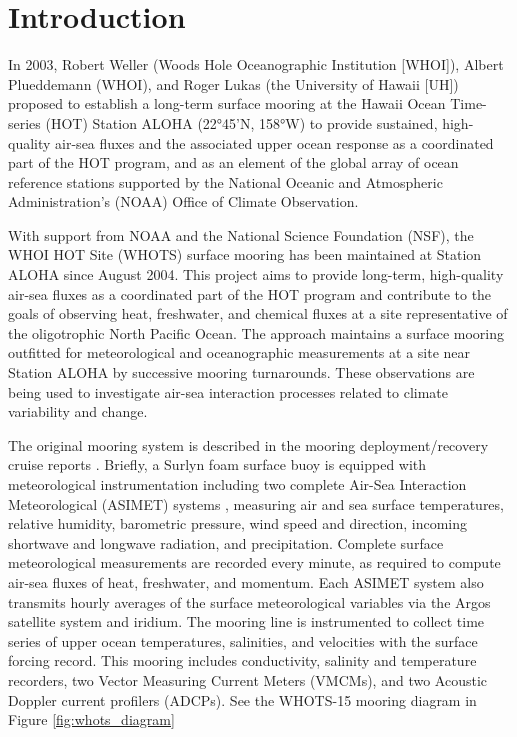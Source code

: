 \section{Introduction}

In 2003, Robert Weller (Woods Hole Oceanographic Institution [WHOI]), Albert Plueddemann (WHOI), and Roger Lukas (the University of Hawaii [UH]) proposed to establish a long-term surface mooring at the Hawaii Ocean Time-series (HOT) Station ALOHA (22°45'N, 158°W) to provide sustained, high-quality air-sea fluxes and the associated upper ocean response as a coordinated part of the HOT program, and as an element of the global array of ocean reference stations supported by the National Oceanic and Atmospheric Administration’s (NOAA) Office of Climate Observation.

With support from NOAA and the National Science Foundation (NSF), the WHOI HOT Site (WHOTS) surface mooring has been maintained at Station ALOHA since August 2004. This project aims to provide long-term, high-quality air-sea fluxes as a coordinated part of the HOT program and contribute to the goals of observing heat, freshwater, and chemical fluxes at a site representative of the oligotrophic North Pacific Ocean. The approach maintains a surface mooring outfitted for meteorological and oceanographic measurements at a site near Station ALOHA by successive mooring turnarounds. These observations are being used to investigate air-sea interaction processes related to climate variability and change.

The original mooring system is described in the mooring deployment/recovery cruise reports \parencite{Plueddemann2006, Whelan2007a}. Briefly, a Surlyn foam surface buoy is equipped with meteorological instrumentation including two complete Air-Sea Interaction Meteorological (ASIMET) systems \parencite{Hosom1995, Colbo2009} , measuring air and sea surface temperatures, relative humidity, barometric pressure, wind speed and direction, incoming shortwave and longwave radiation, and precipitation. Complete surface meteorological measurements are recorded every minute, as required to compute air-sea fluxes of heat, freshwater, and momentum. Each ASIMET system also transmits hourly averages of the surface meteorological variables via the Argos satellite system and iridium. The mooring line is instrumented to collect time series of upper ocean temperatures, salinities, and velocities with the surface forcing record. This mooring includes conductivity, salinity and temperature recorders, two Vector Measuring Current Meters (VMCMs), and two Acoustic Doppler current profilers (ADCPs). See the WHOTS-15 mooring diagram in Figure \ref{fig:whots_diagram} 

